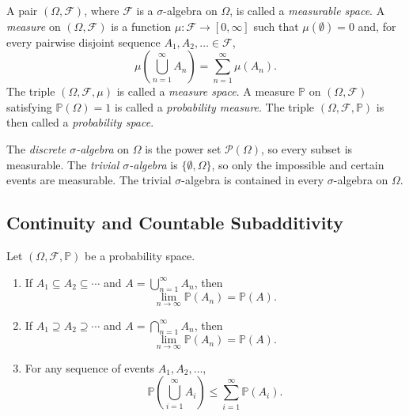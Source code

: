 \documentclass[a4paper,11pt,abstracton]{scrartcl}
\theoremstyle{dotlessP}
\theoremstyle{dotlessS}
\theoremstyle{remark}
\theoremstyle{definition}
\begin{document}
\begin{definition_box}
A pair $(\Omega,\mathcal{F})$, where $\mathcal{F}$ is a $\sigma$-algebra on $\Omega$, is called a \emph{measurable space}. A \emph{measure} on $(\Omega,\mathcal{F})$ is a function $\mu:\mathcal{F}\to[0,\infty]$ such that $\mu(\emptyset)=0$ and, for every pairwise disjoint sequence $A_1,A_2,\ldots\in\mathcal{F}$,
\[
  \mu\!\left(\bigcup_{n=1}^{\infty}A_n\right)
  =\sum_{n=1}^{\infty}\mu(A_n).
\]
The triple $(\Omega,\mathcal{F},\mu)$ is called a \emph{measure space}.
A measure $\mathbb{P}$ on $(\Omega,\mathcal{F})$ satisfying $\mathbb{P}(\Omega)=1$ is called a \emph{probability measure}. The triple $(\Omega,\mathcal{F},\mathbb{P})$ is then called a \emph{probability space}.
\end{definition_box}

\begin{remark_box}
The \emph{discrete $\sigma$-algebra} on $\Omega$ is the power set $\mathcal{P}(\Omega)$, so every subset is measurable. The \emph{trivial $\sigma$-algebra} is $\{\emptyset,\Omega\}$, so only the impossible and certain events are measurable. The trivial $\sigma$-algebra is contained in every $\sigma$-algebra on $\Omega$.
\end{remark_box}

\subsection{Continuity and Countable Subadditivity}

\begin{problem_box}
Let $(\Omega,\mathcal{F},\mathbb{P})$ be a probability space.
\begin{enumerate}
  \item If $A_1\subseteq A_2\subseteq\cdots$ and $A=\bigcup_{n=1}^{\infty}A_n$, then
  \[
    \lim_{n\to\infty}\mathbb{P}(A_n)=\mathbb{P}(A).
  \]
  \item If $A_1\supseteq A_2\supseteq\cdots$ and $A=\bigcap_{n=1}^{\infty}A_n$, then
  \[
    \lim_{n\to\infty}\mathbb{P}(A_n)=\mathbb{P}(A).
  \]
  \item For any sequence of events $A_1,A_2,\ldots$,
  \[
    \mathbb{P}\!\left(\bigcup_{i=1}^{\infty}A_i\right)
    \leq\sum_{i=1}^{\infty}\mathbb{P}(A_i).
  \]
\end{enumerate}
\end{problem_box}
\end{document}
